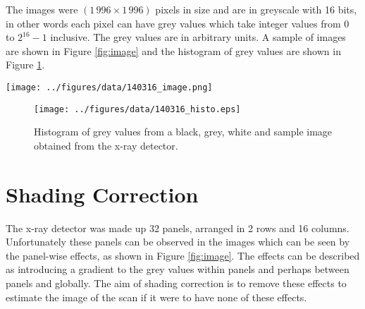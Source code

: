 \documentclass[a4paper]{proc}
\begin{document}
The images were $(1\,996\times1\,996)$ pixels in size and are in greyscale with 16 bits, in other words each pixel can have grey values which take integer values from 0 to $2^{16}-1$ inclusive. The grey values are in arbitrary units. A sample of images are shown in Figure \ref{fig:image} and the histogram of grey values are shown in Figure \ref{fig:hist}.

\begin{figure*}
	\centering
	\texttt{[image: ../figures/data/140316\_image.png]}
	\caption{A black, grey, white and sample image obtained from the x-ray detector.}
	\label{fig:image}
\end{figure*}

\begin{figure}
	\centering
	\texttt{[image: ../figures/data/140316\_histo.eps]}
	\caption{Histogram of grey values from a black, grey, white and sample image obtained from the x-ray detector.}
	\label{fig:hist}
\end{figure}

\section{Shading Correction}
The x-ray detector was made up 32 panels, arranged in 2 rows and 16 columns. Unfortunately these panels can be observed in the images which can be seen by the panel-wise effects, as shown in Figure \ref{fig:image}. The effects can be described as introducing a gradient to the grey values within panels and perhaps between panels and globally. The aim of shading correction is to remove these effects to estimate the image of the scan if it were to have none of these effects.
\end{document}
